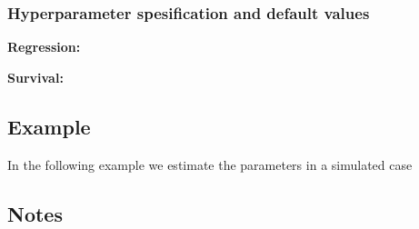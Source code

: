 \documentclass[a4paper,11pt]{article}
\begin{document}
\subsubsection*{Hyperparameter spesification and default values}
\textbf{Regression:}


\textbf{Survival:}



\subsection*{Example}

In the following example we estimate the parameters in a simulated
case 

\subsection*{Notes}
\end{document}
